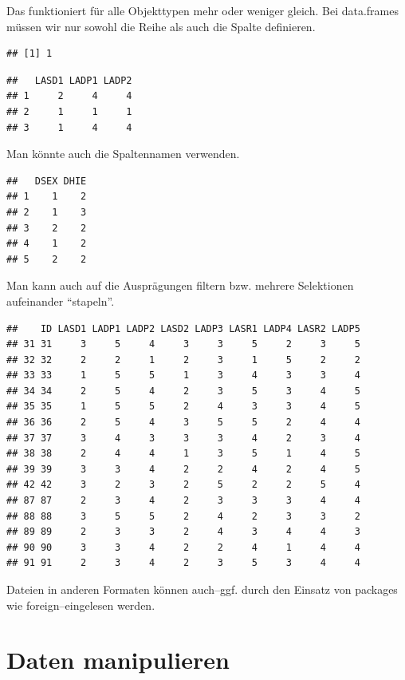 \documentclass[
]{book}
\begin{document}
Das funktioniert für alle Objekttypen mehr oder weniger gleich. Bei data.frames müssen wir nur sowohl die Reihe als auch die Spalte definieren.

\begin{verbatim}
## [1] 1
\end{verbatim}

\begin{verbatim}
##   LASD1 LADP1 LADP2
## 1     2     4     4
## 2     1     1     1
## 3     1     4     4
\end{verbatim}

Man könnte auch die Spaltennamen verwenden.

\begin{verbatim}
##   DSEX DHIE
## 1    1    2
## 2    1    3
## 3    2    2
## 4    1    2
## 5    2    2
\end{verbatim}

Man kann auch auf die Ausprägungen filtern bzw. mehrere Selektionen aufeinander ``stapeln''.

\begin{verbatim}
##    ID LASD1 LADP1 LADP2 LASD2 LADP3 LASR1 LADP4 LASR2 LADP5
## 31 31     3     5     4     3     3     5     2     3     5
## 32 32     2     2     1     2     3     1     5     2     2
## 33 33     1     5     5     1     3     4     3     3     4
## 34 34     2     5     4     2     3     5     3     4     5
## 35 35     1     5     5     2     4     3     3     4     5
## 36 36     2     5     4     3     5     5     2     4     4
## 37 37     3     4     3     3     3     4     2     3     4
## 38 38     2     4     4     1     3     5     1     4     5
## 39 39     3     3     4     2     2     4     2     4     5
## 42 42     3     2     3     2     5     2     2     5     4
## 87 87     2     3     4     2     3     3     3     4     4
## 88 88     3     5     5     2     4     2     3     3     2
## 89 89     2     3     3     2     4     3     4     4     3
## 90 90     3     3     4     2     2     4     1     4     4
## 91 91     2     3     4     2     3     5     3     4     4
\end{verbatim}

Dateien in anderen Formaten können auch--ggf. durch den Einsatz von packages wie foreign--eingelesen werden.

\hypertarget{daten-manipulieren-1}{%
\section{Daten manipulieren}\label{daten-manipulieren-1}}
\end{document}
